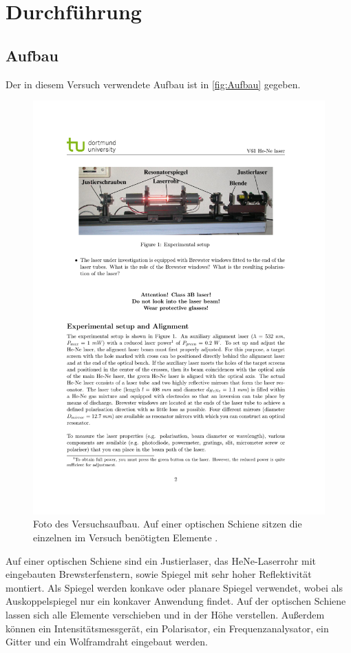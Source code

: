 \section{Durchführung}
\label{sec:Durchführung}
\subsection{Aufbau}
Der in diesem Versuch verwendete Aufbau ist in \autoref{fig:Aufbau} gegeben.
\begin{figure}
    \centering
    \includegraphics{content/pics/Aufbau.pdf}
    \caption{Foto des Versuchsaufbau. Auf einer optischen Schiene sitzen die einzelnen im Versuch benötigten Elemente \cite{v61}.}
    \label{fig:Aufbau}
\end{figure}
Auf einer optischen Schiene sind ein Justierlaser, das HeNe-Laserrohr mit eingebauten Brewsterfenstern, sowie Spiegel mit sehr hoher Reflektivität montiert.
Als Spiegel werden konkave oder planare Spiegel verwendet, wobei als Auskoppelspiegel nur ein konkaver Anwendung findet. Auf der optischen Schiene lassen sich alle
Elemente verschieben und in der Höhe verstellen. Außerdem können ein Intensitätsmessgerät, ein Polarisator, ein Frequenzanalysator, ein Gitter und ein Wolframdraht eingebaut 
werden.

